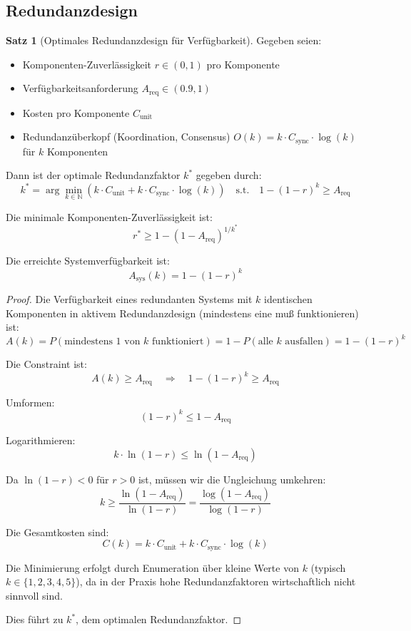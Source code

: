 \documentclass[a4paper,11pt]{article}
\theoremstyle{definition}
\newtheorem{satz}{Satz}
\newenvironment{beweis}{\begin{proof}}{\end{proof}}
\begin{document}
\subsection{Redundanzdesign}

\begin{satz}[Optimales Redundanzdesign für Verfügbarkeit]
    \label{satz:redundancy}
    Gegeben seien:
    \begin{itemize}
        \item Komponenten-Zuverlässigkeit $r \in (0, 1)$ pro Komponente
        \item Verfügbarkeitsanforderung $A_{\text{req}} \in (0.9, 1)$
        \item Kosten pro Komponente $C_{\text{unit}}$
        \item Redundanzüberkopf (Koordination, Consensus) $O(k) = k \cdot C_{\text{sync}} \cdot \log(k)$ 
              für $k$ Komponenten
    \end{itemize}

    Dann ist der optimale Redundanzfaktor $k^*$ gegeben durch:
    \[
        k^* = \arg \min_{k \in \mathbb{N}} \left( k \cdot C_{\text{unit}} + k \cdot C_{\text{sync}} \cdot \log(k) \right)
        \quad \text{s.t.} \quad
        1 - (1-r)^k \geq A_{\text{req}}
    \]

    Die minimale Komponenten-Zuverlässigkeit ist:
    \[
        r^* \geq 1 - (1 - A_{\text{req}})^{1/k^*}
    \]

    Die erreichte Systemverfügbarkeit ist:
    \[
        A_{\text{sys}}(k) = 1 - (1-r)^k
    \]

    \begin{beweis}
        Die Verfügbarkeit eines redundanten Systems mit $k$ identischen Komponenten 
        in aktivem Redundanzdesign (mindestens eine muß funktionieren) ist:
        \[
            A(k) = P(\text{mindestens 1 von } k \text{ funktioniert}) = 1 - P(\text{alle } k \text{ ausfallen})
            = 1 - (1-r)^k
        \]

        Die Constraint ist:
        \[
            A(k) \geq A_{\text{req}} \quad \Rightarrow \quad 1 - (1-r)^k \geq A_{\text{req}}
        \]

        Umformen:
        \[
            (1-r)^k \leq 1 - A_{\text{req}}
        \]

        Logarithmieren:
        \[
            k \cdot \ln(1-r) \leq \ln(1 - A_{\text{req}})
        \]

        Da $\ln(1-r) < 0$ für $r > 0$ ist, müssen wir die Ungleichung umkehren:
        \[
            k \geq \frac{\ln(1 - A_{\text{req}})}{\ln(1-r)} = \frac{\log(1 - A_{\text{req}})}{\log(1-r)}
        \]

        Die Gesamtkosten sind:
        \[
            C(k) = k \cdot C_{\text{unit}} + k \cdot C_{\text{sync}} \cdot \log(k)
        \]

        Die Minimierung erfolgt durch Enumeration über kleine Werte von $k$ (typisch $k \in \{1, 2, 3, 4, 5\}$), 
        da in der Praxis hohe Redundanzfaktoren wirtschaftlich nicht sinnvoll sind.

        Dies führt zu $k^*$, dem optimalen Redundanzfaktor.
    \end{beweis}
\end{satz}
\end{document}
